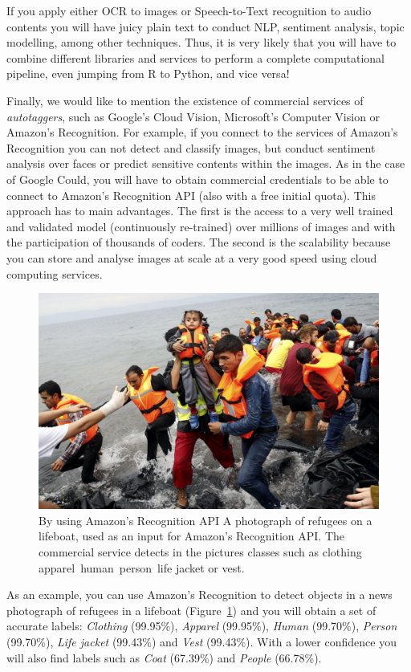 If you apply either OCR to images or Speech-to-Text recognition to audio contents you will have juicy plain text to conduct NLP, sentiment analysis, topic modelling, among other techniques.  Thus, it is very likely that you will have to combine different libraries and services to perform a complete computational pipeline, even jumping from R to Python, and vice versa!

Finally, we would like to mention the existence of commercial services of \textit{autotaggers}, such as Google's Cloud Vision, Microsoft's Computer Vision or Amazon's Recognition. For example, if you connect to the services of Amazon's Recognition you can not detect and classify images, but conduct sentiment analysis over faces or predict sensitive contents within the images. As in the case of Google Could, you will have to obtain commercial credentials to be able to connect to Amazon's Recognition API (also with a free initial quota). This approach has to main advantages. The first is the access to a very well trained and validated model (continuously re-trained) over millions of images and with the participation of thousands of coders. The second is the scalability because you can store and analyse images at scale at a very good speed using cloud computing services.

\begin{figure}
\centering
\includegraphics[width=0.9\linewidth]{figures/ch15_refugees.png}
\caption{By using Amazon's Recognition API
A photograph of refugees on a lifeboat, used as an input for Amazon's Recognition API. The commercial service detects in the pictures classes such as clothing\, apparel\, human\, person\, life jacket or vest.}
\label{fig:refugees}
\end{figure}

As an example, you can use Amazon's Recognition to detect objects in a news photograph of refugees in a lifeboat (Figure~\ref{fig:refugees}) and you will obtain a set of accurate labels: \textit{Clothing} (99.95\%), \textit{Apparel} (99.95\%), \textit{Human} (99.70\%), \textit{Person} (99.70\%), \textit{Life jacket} (99.43\%) and \textit{Vest} (99.43\%). With a lower confidence you will also find labels such as \textit{Coat} (67.39\%) and \textit{People} (66.78\%). 

